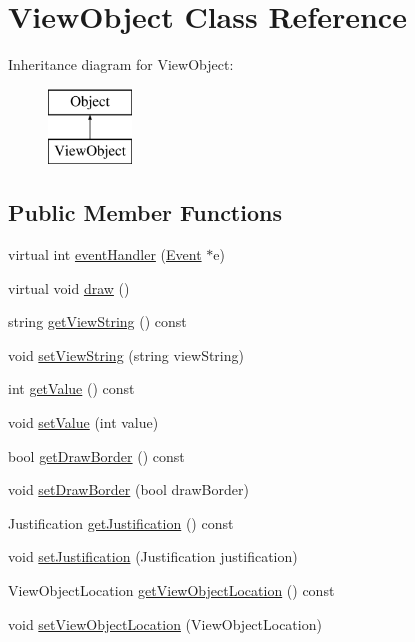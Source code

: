 \hypertarget{class_view_object}{\section{View\+Object Class Reference}
\label{class_view_object}
}
Inheritance diagram for View\+Object\+:\begin{figure}[H]
\begin{center}
\leavevmode
\includegraphics[height=2.000000cm]{class_view_object}
\end{center}
\end{figure}
\subsection*{Public Member Functions}
\begin{DoxyCompactItemize}
\item 
virtual int \hyperlink{class_view_object_aae06f1481afddf829a97b045a0c60bb7}{event\+Handler} (\hyperlink{class_event}{Event} $\ast$e)
\item 
virtual void \hyperlink{class_view_object_aae76e90e25d65e34d80e468b41af95da}{draw} ()
\item 
string \hyperlink{class_view_object_aca2716919c8e5cad80898a7f9962ddcc}{get\+View\+String} () const 
\item 
void \hyperlink{class_view_object_adae1f08a437032a52db37a6b7e84d046}{set\+View\+String} (string view\+String)
\item 
int \hyperlink{class_view_object_a87877b05cb9a8d44a77dc173b7738d62}{get\+Value} () const 
\item 
void \hyperlink{class_view_object_a7b6c99fea863c7eac45cbe8fcff03d96}{set\+Value} (int value)
\item 
bool \hyperlink{class_view_object_a2ba768ed1d2301a8cc06531854462078}{get\+Draw\+Border} () const 
\item 
void \hyperlink{class_view_object_a19e870c7720b8174e8293a8287d111a2}{set\+Draw\+Border} (bool draw\+Border)
\item 
Justification \hyperlink{class_view_object_a02a8ccd6e642e1f3274f1c8523c992d4}{get\+Justification} () const 
\item 
void \hyperlink{class_view_object_a48b915f41e561fd210ea5e22d690aa10}{set\+Justification} (Justification justification)
\item 
View\+Object\+Location \hyperlink{class_view_object_ac0672505b7a72ec0a4be8f261bcffe5c}{get\+View\+Object\+Location} () const 
\item 
void \hyperlink{class_view_object_a2a3ae5cb263ecc0597d1b0cc85c0300e}{set\+View\+Object\+Location} (View\+Object\+Location)
\end{DoxyCompactItemize}


